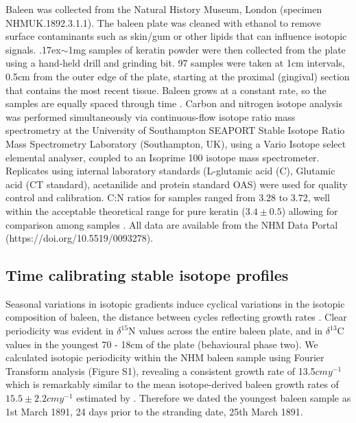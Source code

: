 \documentclass[a4paper,12pt]{article}
\begin{document}
Baleen was collected from the Natural History Museum, London (specimen NHMUK.1892.3.1.1). 
The baleen plate was cleaned with ethanol to remove surface contaminants such as skin/gum or other lipids that can influence isotopic signals. 
{\raise.17ex\hbox{$\scriptstyle\sim$}}1mg samples of keratin powder were then collected from the plate using a hand-held drill and grinding bit. 
97 samples were taken at 1cm intervals, 0.5cm from the outer edge of the plate, starting at the proximal (gingival) section that contains the most recent tissue. 
Baleen grows at a constant rate, so the samples are equally spaced through time \citep{best1996stable}. 
Carbon and nitrogen isotope analysis was performed simultaneously via continuous-flow isotope ratio mass spectrometry at the University of Southampton SEAPORT Stable Isotope Ratio Mass Spectrometry Laboratory (Southampton, UK), using a Vario Isotope select elemental analyser, coupled to an Isoprime 100 isotope mass spectrometer. 
Replicates using internal laboratory standards (L-glutamic acid (C), Glutamic acid (CT standard), acetanilide and protein standard OAS) were used for quality control and calibration. 
C:N ratios for samples ranged from 3.28\text{\textperthousand} to 3.72\text{\textperthousand}, well within the acceptable theoretical range for pure keratin ($3.4\pm0.5$) allowing for comparison among samples \citep{hobson1998stable}. 
All data are available from the NHM Data Portal \citep{data-set} (https://doi.org/10.5519/0093278).

\subsection{Time calibrating stable isotope profiles}
\label{time-calibrating-stable-isotope-profiles}

Seasonal variations in isotopic gradients induce cyclical variations in the isotopic composition of baleen, the distance between cycles reflecting growth rates \citep{hobson1998stable,busquets2017estimating}. 
Clear periodicity was evident in $\delta^{15}$N values across the entire baleen plate, and in $\delta^{13}$C values in the youngest 70 - 18cm of the plate (behavioural phase two). 
We calculated isotopic periodicity within the NHM baleen sample using Fourier Transform analysis \citep{cardona2017temporal} (Figure S1), revealing a consistent growth rate of 13.5$cmy^{-1}$ which is remarkably similar to the mean isotope-derived baleen growth rates of $15.5 \pm 2.2cmy^{-1}$ estimated by \cite{busquets2017estimating}.  
Therefore we dated the youngest baleen sample as 1st March 1891, 24 days prior to the stranding date, 25th March 1891. 
\end{document}

